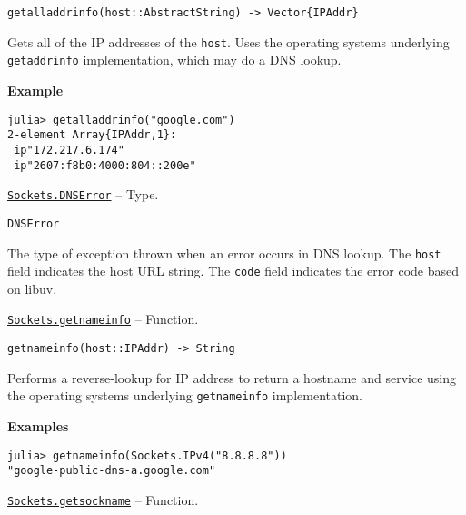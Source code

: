 \begin{adjustwidth}{2em}{0pt}


\begin{verbatim}
getalladdrinfo(host::AbstractString) -> Vector{IPAddr}
\end{verbatim}

Gets all of the IP addresses of the \texttt{host}. Uses the operating system{\textquotesingle}s underlying \texttt{getaddrinfo} implementation, which may do a DNS lookup.

\textbf{Example}


\begin{verbatim}
julia> getalladdrinfo("google.com")
2-element Array{IPAddr,1}:
 ip"172.217.6.174"
 ip"2607:f8b0:4000:804::200e"
\end{verbatim}



\end{adjustwidth}
\hypertarget{4174672165194898466}{}
\hyperlink{4174672165194898466}{\texttt{Sockets.DNSError}}  -- {Type.}

\begin{adjustwidth}{2em}{0pt}


\begin{verbatim}
DNSError
\end{verbatim}

The type of exception thrown when an error occurs in DNS lookup. The \texttt{host} field indicates the host URL string. The \texttt{code} field indicates the error code based on libuv.



\end{adjustwidth}
\hypertarget{8933801763213702510}{}
\hyperlink{8933801763213702510}{\texttt{Sockets.getnameinfo}}  -- {Function.}

\begin{adjustwidth}{2em}{0pt}


\begin{verbatim}
getnameinfo(host::IPAddr) -> String
\end{verbatim}

Performs a reverse-lookup for IP address to return a hostname and service using the operating system{\textquotesingle}s underlying \texttt{getnameinfo} implementation.

\textbf{Examples}


\begin{verbatim}
julia> getnameinfo(Sockets.IPv4("8.8.8.8"))
"google-public-dns-a.google.com"
\end{verbatim}



\end{adjustwidth}
\hypertarget{16393779334284193287}{}
\hyperlink{16393779334284193287}{\texttt{Sockets.getsockname}}  -- {Function.}

